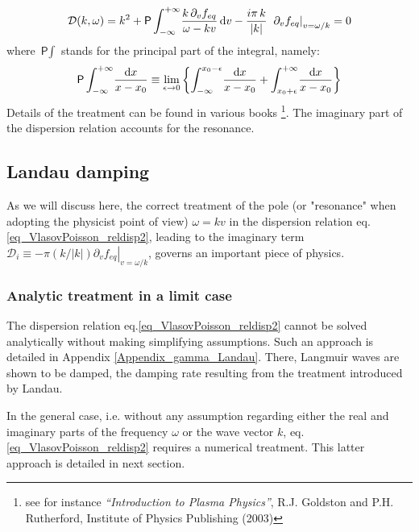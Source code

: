 \documentclass[11pt]{article}
\newcommand{\dd}{\textrm d}
\begin{document}
\begin{equation}
  \mathcal{D}(k,\omega) =
  k^2+ \textsf{P}\int_{-\infty}^{+\infty}\!
  \frac{k\, \partial_v f_{eq}}{\omega - kv} \,\dd v -
  \frac{i \pi\, k}{|k|} \;\left.\partial_v f_{eq}\right|_{v=\omega/k}
  =0 \label{eq_VlasovPoisson_reldisp2}
\end{equation}
where $\textsf{P}\int$ stands for the principal part of the
integral, namely:
\begin{equation*}
 \textsf{P}\int_{-\infty}^{+\infty}\! \frac{\dd x}{x-x_0}
 \equiv \lim_{\epsilon \rightarrow0} \left\{ \int_{-\infty}^{x_0
 -\epsilon}\! \frac{\dd x}{x-x_0} +\int_{x_0
 +\epsilon}^{+\infty}\! \frac{\dd x}{x-x_0} \right\}
\end{equation*}
Details of the treatment can be found in various books \footnote{see for instance \emph{``Introduction to Plasma Physics''}, R.J. Goldston and P.H. Rutherford, Institute of Physics Publishing (2003)}. The imaginary part of the dispersion relation accounts for the resonance.

\subsection{Landau damping}

As we will discuss here, the correct treatment of the pole (or
"resonance" when adopting the physicist point of view) $\omega =
kv$ in the dispersion relation eq.\eqref{eq_VlasovPoisson_reldisp2},
leading to the imaginary term $\mathcal{D}_i \equiv -\pi (k/|k|)
\left.\partial_v f_{eq}\right|_{v=\omega/k}$, governs an important
piece of physics.


\subsubsection{Analytic treatment in a limit case}

The dispersion relation eq.\eqref{eq_VlasovPoisson_reldisp2} cannot be solved analytically without making simplifying assumptions. Such an approach is detailed in Appendix \ref{Appendix_gamma_Landau}. There, Langmuir waves are shown to be damped, the damping rate resulting from the treatment introduced by Landau.

In the general case, i.e. without any assumption regarding either the real and imaginary parts of the frequency $\omega$ or the wave vector $k$, eq.\eqref{eq_VlasovPoisson_reldisp2} requires a numerical treatment. This latter approach is detailed in next section.
\end{document}
